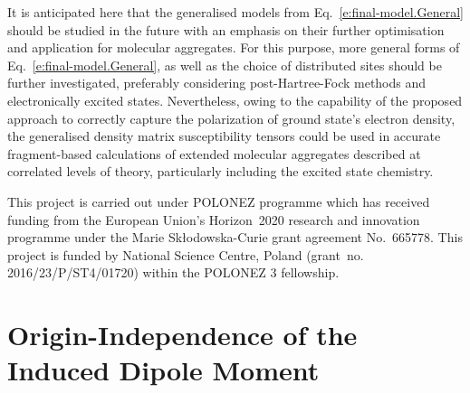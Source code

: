 \documentclass[aip,amsmath,amssymb,reprint,floatfix]{revtex4-1}
\newcommand*{\InlineImage}[1]{%
    \raisebox{-.02\baselineskip}{%
        \texttt{[image: \#1]}%
    }%
}
\begin{document}
It is anticipated here that the generalised models from Eq.~\eqref{e:final-model.General}
should be studied in the future with an emphasis 
on their further optimisation and application for molecular aggregates.
For this purpose, more general forms of Eq.~\eqref{e:final-model.General}, as well as the choice of distributed
sites should be further investigated, preferably considering post\hyp{}Hartree\hyp{}Fock methods
and electronically excited states.
Nevertheless, owing to the capability of the proposed approach to correctly capture the 
polarization of ground state's electron density,
the generalised density matrix susceptibility tensors 
could be used in accurate fragment\hyp{}based calculations of extended molecular aggregates
described at correlated levels of theory, particularly including the excited state chemistry.

\begin{acknowledgments}
This project is carried out under POLONEZ programme which has received funding from the European Union's
Horizon~2020 research and innovation programme under the Marie Skłodowska-Curie grant agreement 
No.~665778. \InlineImage{eu-logo.eps} This project is funded by National Science Centre, Poland 
(grant~no. 2016/23/P/ST4/01720) within the POLONEZ 3 fellowship. 
\end{acknowledgments}

%
\appendix

\section{\label{a:orig-dep} Origin-Independence of the Induced Dipole Moment}
\end{document}

